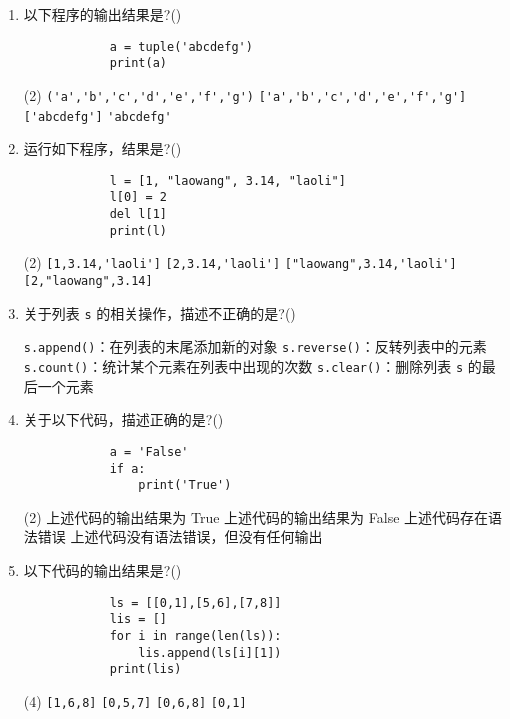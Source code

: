 \documentclass[11pt]{ctexart}
\begin{document}
\begin{enumerate}
        \item 以下程序的输出结果是?(\qquad)
        \begin{lstlisting}
            a = tuple('abcdefg')
            print(a)
        \end{lstlisting}
        \begin{tasks}(2)
            \task \lstinline{('a','b','c','d','e','f','g')}
            \task \lstinline{['a','b','c','d','e','f','g']}
            \task \lstinline{['abcdefg']}
            \task \lstinline{'abcdefg'}
        \end{tasks}

        \item 运行如下程序，结果是?(\qquad)
        \begin{lstlisting}
            l = [1, "laowang", 3.14, "laoli"]
            l[0] = 2
            del l[1]
            print(l)
        \end{lstlisting}
        \begin{tasks}(2)
            \task \lstinline{[1,3.14,'laoli']}
            \task \lstinline{[2,3.14,'laoli']}
            \task \lstinline{["laowang",3.14,'laoli']}
            \task \lstinline{[2,"laowang",3.14]}
        \end{tasks}

        \item 关于列表 \lstinline{s} 的相关操作，描述不正确的是?(\qquad)
        \begin{tasks}
            \task \lstinline{s.append()}：在列表的末尾添加新的对象
            \task \lstinline{s.reverse()}：反转列表中的元素
            \task \lstinline{s.count()}：统计某个元素在列表中出现的次数
            \task \lstinline{s.clear()}：删除列表 \lstinline{s} 的最后一个元素
        \end{tasks}

        \item 关于以下代码，描述正确的是?(\qquad)
        \begin{lstlisting}
            a = 'False'
            if a:
                print('True')
        \end{lstlisting}
        \begin{tasks}(2)
            \task 上述代码的输出结果为 True
            \task 上述代码的输出结果为 False
            \task 上述代码存在语法错误
            \task 上述代码没有语法错误，但没有任何输出
        \end{tasks}

        \item 以下代码的输出结果是?(\qquad)
        \begin{lstlisting}
            ls = [[0,1],[5,6],[7,8]]
            lis = []
            for i in range(len(ls)):
                lis.append(ls[i][1])
            print(lis)
        \end{lstlisting}
        \begin{tasks}(4)
            \task \lstinline{[1,6,8]}
            \task \lstinline{[0,5,7]}
            \task \lstinline{[0,6,8]}
            \task \lstinline{[0,1]}
        \end{tasks}


\end{enumerate}
\end{document}
